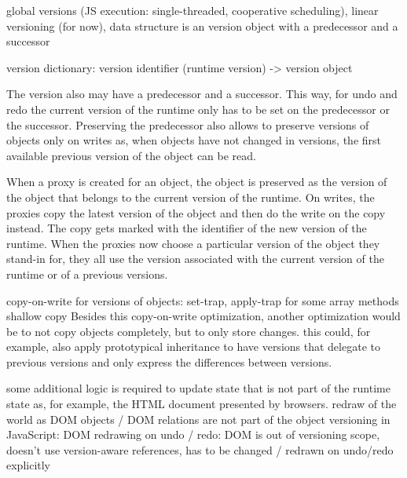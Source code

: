 

global versions (JS execution: single-threaded, cooperative scheduling), linear versioning (for now), data structure is an version object with a predecessor and a successor

version dictionary: version identifier (runtime version) -> version object

The version also may have a predecessor and a successor.
This way, for undo and redo the current version of the runtime only has to be set on the predecessor or the successor.
Preserving the predecessor also allows to preserve versions of objects only on writes as, when objects have not changed in versions, the first available previous version of the object can be read.


When a proxy is created for an object, the object is preserved as the version of the object that belongs to the current version of the runtime.
On writes, the proxies copy the latest version of the object and then do the write on the copy instead.
The copy gets marked with the identifier of the new version of the runtime.
When the proxies now choose a particular version of the object they stand-in for, they all use the version associated with the current version of the runtime or of a previous versions.

copy-on-write for versions of objects: set-trap, apply-trap for some array methods
shallow copy
Besides this copy-on-write optimization, another optimization would be to not copy objects completely, but to only store changes.
this could, for example, also apply prototypical inheritance to have versions that delegate to previous versions and only express the differences between versions.



some additional logic is required to update state that is not part of the runtime state as, for example, the HTML document presented by browsers.
redraw of the world as DOM objects / DOM relations are not part of the object versioning in JavaScript: DOM redrawing on undo / redo: DOM is out of versioning scope, doesn’t use version-aware references, has to be changed / redrawn on undo/redo explicitly




